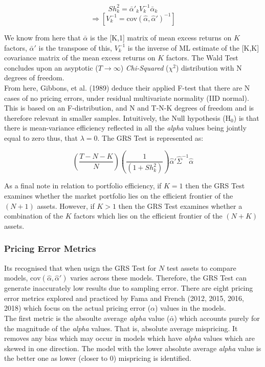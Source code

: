 \documentclass[11pt, english]{article}
\begin{document}
        $$Sh_k^2={\bar{\alpha}'}_kV_k^{-1}{\bar{\alpha}}_k$$
        $$\Rightarrow[V_k^{-1}=\mathrm{cov}(\hat{\alpha},\hat{\alpha}')^{-1}]$$

        We know from here that $\bar{\alpha}$ is the [K,1] matrix of mean excess returns on $K$ factors, ${\bar{\alpha}}'$ is the transpose of this, $V_k^{-1}$ is the inverse of ML estimate of the [K,K] covariance matrix of the mean excess returns on $K$ factors. The Wald Test concludes upon an asyptotic ($T\longrightarrow\infty$) \textit{Chi-Squared} ($\chi^2$) distribution with N degrees of freedom.\\

        From here, Gibbons, et al. (1989) deduce their applied F-test that there are N cases of no pricing errors, under residual multivariate normality (IID normal). This is based on an F-distribution, and N and T-N-K degrees of freedom and is therefore relevant in smaller samples. Intuitively, the Null hypothesis (H$_0$) is that there is mean-variance efficiency reflected in all the \textit{alpha} values being jointly equal to zero thus, that $\lambda=0$. The GRS Test is represented as:

        $$\left(\frac{T-N-K}{N}\right)\left(\frac{1}{(1+Sh_k^2)}\right)\hat{\alpha}'\hat{\Sigma}^{-1}\hat{\alpha}$$

        As a final note in relation to portfolio efficiency, if $K=1$ then the GRS Test examines whether the market portfolio lies on the efficient frontier of the $(N+1)$ assets. However, if $K>1$ then the GRS Test examines whether a combination of the $K$ factors which lies on the efficient frontier of the $(N+K)$ assets.		

		\subsubsection*{Pricing Error Metrics}

        Its recognised that when usign the GRS Test for $N$ test assets to compare models, $\mathrm{cov}(\hat{\alpha},\hat{\alpha}')$ varies across these models. Therefore, the GRS Test can generate inaccurately low results due to sampling error. There are eight pricing error metrics explored and practiced by Fama and French (2012, 2015, 2016, 2018) which focus on the actual pricing error ($\alpha$) values in the models.\\

        The first metric is the absoulte average \textit{alpha} value ($\bar{\alpha}$) which accounts purely for the magnitude of the \textit{alpha} values. That is, absolute average mispricing. It removes any bias which may occur in models which have \textit{alpha} values which are skewed in one direction. The model with the lower absolute average \textit{alpha} value is the better one as lower (closer to 0) mispricing is identified.\\
\end{document}
